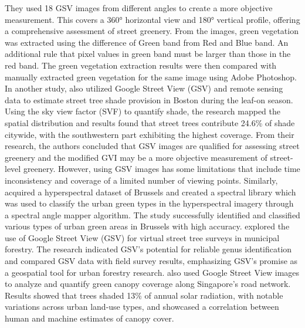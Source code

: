 They used 18 GSV images from different angles to create a more objective measurement. This covers a 360° horizontal view and 180° vertical profile, offering a comprehensive assessment of street greenery.
From the images, green vegetation was extracted using the difference of Green band from Red and Blue band. An additional rule
that pixel values in green band must be larger than those in the red band. 
The green vegetation extraction results were then compared with manually extracted green vegetation for the same image using Adobe Photoshop. \newline
In another study,  also utilized Google Street View (GSV) and remote sensing data to estimate street tree shade provision in Boston during the leaf-on season. Using the sky view factor (SVF) to quantify shade, the research mapped the spatial distribution and results found that street trees contribute 24.6\% of shade citywide, with the southwestern part exhibiting the highest coverage.
 From their research, the authors concluded that GSV images
are qualified for assessing street greenery and the modified GVI may be a more objective measurement of street-level greenery. However, using GSV images has some limitations that include time inconsistency and coverage of a limited number of viewing points.
\newline
Similarly,  acquired a hyperspectral dataset of Brussels and created a spectral library which was used to classify the urban green types in the hyperspectral imagery through a spectral angle mapper algorithm. The study successfully identified and classified various types of urban green areas in Brussels with high accuracy. \newline
{} explored the use of Google Street View (GSV) for virtual street tree surveys in municipal forestry. The research indicated GSV's potential for reliable genus identification and compared GSV data with field survey results, emphasizing GSV's promise as a geospatial tool for urban forestry research.
\newline
{} also used Google Street View images to analyze and quantify green canopy coverage along Singapore's road network. Results showed that trees shaded 13\% of annual solar radiation, with notable variations across urban land-use types, and showcased a correlation between human and machine estimates of canopy cover.


